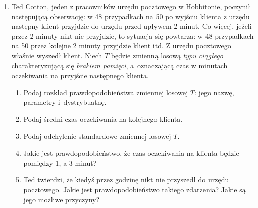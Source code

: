 \documentclass[twoside]{mwart}
\newcommand{\ans}[1]{}
\newenvironment{ansenv}{\comment}{\endcomment}
\newenvironment{ansenv}{\paragraph{Odpowiedź:}}{}
\newcommand{\ans}[1]{\begin{ansenv}#1\end{ansenv}}
\begin{document}
\begin{enumerate}
\item Ted Cotton, jeden z pracowników urzędu pocztowego w Hobbitonie, poczynił następującą obserwację: w 48 przypadkach na 50 po wyjściu klienta z urzędu następny klient przyjdzie do urzędu przed upływem 2 minut.
Co więcej, jeżeli przez 2 minuty nikt nie przyjdzie, to sytuacja się powtarza: w 48 przypadkach na 50 przez kolejne 2 minuty przyjdzie klient itd.
Z urzędu pocztowego właśnie wyszedł klient.
Niech $T$ będzie zmienną losową \emph{typu ciągłego} charakteryzującą się \emph{brakiem pamięci}, a~oznaczającą czas w minutach oczekiwania na przyjście następnego klienta.

\begin{enumerate}
	\item Podaj rozkład prawdopodobieństwa zmiennej losowej $T$: jego nazwę, parametry i~dystrybuatnę.
	\ans
	{
		Rozkład wykładniczy
		\begin{gather*}
		F(x) = \begin{cases} 1-e^{-\lambda x} & x>0 \\ 0 & \text{wpp} \end{cases} \\
		P(T<2)=F(2)=\frac{48}{50} \\
		1-e^{-2\lambda}=\frac{24}{25} \\
		e^{-2\lambda}=\frac{1}{25} \\ 
		-2\lambda = \ln \frac{1}{25} = -2 \ln 5 \\
		\lambda = \ln 5 \approx 1{,}609
		\end{gather*}
	}
	\item Podaj średni czas oczekiwania na kolejnego klienta.
	\ans{ $ET = \frac{1}{\lambda} = \frac{1}{\ln 5} \approx 0{,}621$ }
	\item Podaj odchylenie standardowe zmiennej losowej $T$.
	\ans{$DT=ET=\frac{1}{\lambda} = \frac{1}{\ln 5} \approx 0{,}621$ }
	\item Jakie jest prawdopodobieństwo, że czas oczekiwania na klienta będzie pomiędzy 1, a 3 minut?
	\ans{$P(1\leq T\leq 3) = F(3)-F(1) = 1-e^{-3\lambda}-(1-e^{-\lambda}) = e^{-\lambda}-e^{-3\lambda}=5^{-1}-5^{-3}=\frac{5^2-1}{5^3}=\frac{24}{125}=0{,}192$}
	\item Ted twierdzi, że kiedyś przez godzinę nikt nie przyszedł do urzędu pocztowego. Jakie jest prawdopodobieństwo takiego zdarzenia? Jakie są jego możliwe przyczyny?
	\ans{$P(T>60)=1-F(60)=1-(1-e^{-60\lambda}) = 5^{-60} \approx 0$}
\end{enumerate}

\end{enumerate}
\end{document}
